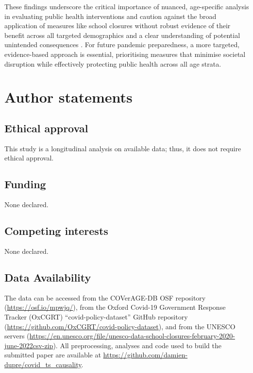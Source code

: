 \documentclass[]{interact}
\theoremstyle{plain}%
\theoremstyle{definition}
\theoremstyle{remark}
\begin{document}
These findings underscore the critical importance of nuanced, age-specific analysis in evaluating public health interventions and caution against the broad application of measures like school closures without robust evidence of their benefit across all targeted demographics and a clear understanding of potential unintended consequences \citep{alfano2020efficacy, molefi2021impact}. For future pandemic preparedness, a more targeted, evidence-based approach is essential, prioritising measures that minimise societal disruption while effectively protecting public health across all age strata.

\section{Author statements}\label{author-statements}

\subsection{Ethical approval}\label{ethical-approval}

This study is a longitudinal analysis on available data; thus, it does not require ethical approval.

\subsection{Funding}\label{funding}

None declared.

\subsection{Competing interests}\label{competing-interests}

None declared.

\subsection{Data Availability}\label{data-availability}

The data can be accessed from the COVerAGE-DB OSF repository (\url{https://osf.io/mpwjq/}), from the Oxford Covid-19 Government Response Tracker (OxCGRT) ``covid-policy-dataset'' GitHub repository (\url{https://github.com/OxCGRT/covid-policy-dataset}), and from the UNESCO servers (\url{https://en.unesco.org/file/unesco-data-school-closures-february-2020-june-2022csv-zip}). All preprocessing, analyses and code used to build the submitted paper are available at \url{https://github.com/damien-dupre/covid_ts_causality}.



\end{document}
